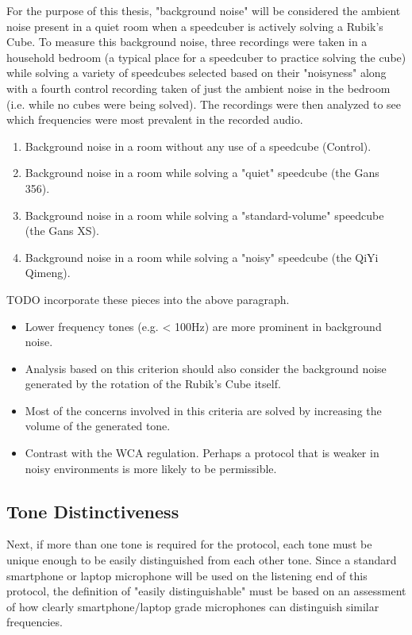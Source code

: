 For the purpose of this thesis, "background noise" will be considered the ambient noise present in a quiet room when a speedcuber is actively solving a Rubik's Cube.
To measure this background noise, three recordings were taken in a household bedroom (a typical place for a speedcuber to practice solving the cube) while solving a variety of speedcubes selected based on their "noisyness" along with a fourth control recording taken of just the ambient noise in the bedroom (i.e. while no cubes were being solved).
The recordings were then analyzed to see which frequencies were most prevalent in the recorded audio. 
\begin{enumerate}
    \item Background noise in a room without any use of a speedcube (Control).
    \item Background noise in a room while solving a "quiet" speedcube (the Gans 356).
    \item Background noise in a room while solving a "standard-volume" speedcube (the Gans XS).
    \item Background noise in a room while solving a "noisy" speedcube (the QiYi Qimeng).
\end{enumerate}
TODO incorporate these pieces into the above paragraph.
\begin{itemize}
    \item Lower frequency tones (e.g. < 100Hz) are more prominent in background noise.
    \item Analysis based on this criterion should also consider the background noise generated by the rotation of the Rubik's Cube itself.
    \item Most of the concerns involved in this criteria are solved by increasing the volume of the generated tone.
    \item Contrast with the WCA regulation. Perhaps a protocol that is weaker in noisy environments is more likely to be permissible.
\end{itemize}

\subsection{Tone Distinctiveness}
Next, if more than one tone is required for the protocol, each tone must be unique enough to be easily distinguished from each other tone.
Since a standard smartphone or laptop microphone will be used on the listening end of this protocol, the definition of "easily distinguishable" must be based on an assessment of how clearly smartphone/laptop grade microphones can distinguish similar frequencies. %

